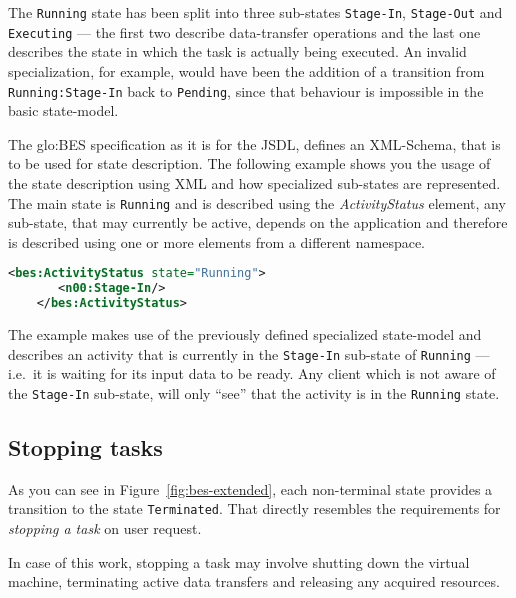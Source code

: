 The  \texttt{Running}   state  has   been  split  into   three  sub-states
\texttt{Stage-In}, \texttt{Stage-Out} and \texttt{Executing} --- the first
two describe data-transfer operations and the last one describes the state
in which the task is  actually being executed.  An invalid specialization,
for  example,  would   have  been  the  addition  of   a  transition  from
\texttt{Running:Stage-In} back  to \texttt{Pending}, since  that behaviour
is impossible in the basic state-model.

The  \gls{glo:BES}  specification  as  it  is for  the  JSDL,  defines  an
XML-Schema,  that is  to  be  used for  state  description. The  following
example shows  you the usage  of the state  description using XML  and how
specialized sub-states are represented. The main state is \texttt{Running}
and is  described using the \emph{ActivityStatus}  element, any sub-state,
that may currently be active,  depends on the application and therefore is
described using one or more elements from a different namespace.

\begin{minipage}{0.75\textwidth}
  \begin{lstlisting}[language=XML]
    <bes:ActivityStatus state="Running">
       <n00:Stage-In/>
    </bes:ActivityStatus>
  \end{lstlisting}
\end{minipage}

The example  makes use of  the previously defined  specialized state-model
and  describes an  activity  that is  currently  in the  \texttt{Stage-In}
sub-state of \texttt{Running} --- i.e.~it is waiting for its input data to
be  ready.  Any  client  which  is  not  aware  of  the  \texttt{Stage-In}
sub-state, will only ``see'' that  the activity is in the \texttt{Running}
state.


\subsection{Stopping tasks}
\label{sec:stopping-task}

As  you can  see in  Figure~\ref{fig:bes-extended}, each  non-terminal state
provides  a transition  to  the state  \texttt{Terminated}. That  directly
resembles the requirements for \emph{stopping a task} on user request.

In  case of  this work,  stopping  a task  may involve  shutting down  the
virtual  machine,  terminating active  data  transfers  and releasing  any
acquired resources.

